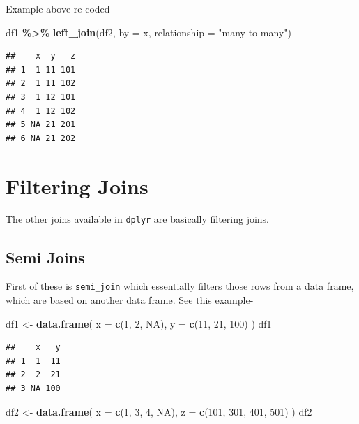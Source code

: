 \documentclass[
]{book}
\newenvironment{Shaded}{\begin{snugshade}}{\end{snugshade}}
\newcommand{\AttributeTok}[1]{\textcolor[rgb]{0.13,0.29,0.53}{#1}}
\newcommand{\ConstantTok}[1]{\textcolor[rgb]{0.56,0.35,0.01}{#1}}
\newcommand{\DecValTok}[1]{\textcolor[rgb]{0.00,0.00,0.81}{#1}}
\newcommand{\FunctionTok}[1]{\textcolor[rgb]{0.13,0.29,0.53}{\textbf{#1}}}
\newcommand{\NormalTok}[1]{#1}
\newcommand{\OtherTok}[1]{\textcolor[rgb]{0.56,0.35,0.01}{#1}}
\newcommand{\SpecialCharTok}[1]{\textcolor[rgb]{0.81,0.36,0.00}{\textbf{#1}}}
\newcommand{\StringTok}[1]{\textcolor[rgb]{0.31,0.60,0.02}{#1}}
\begin{document}
Example above re-coded

\begin{Shaded}
\begin{Highlighting}[]
\NormalTok{df1 }\SpecialCharTok{\%\textgreater{}\%} \FunctionTok{left\_join}\NormalTok{(df2, }\AttributeTok{by =} \StringTok{\textquotesingle{}x\textquotesingle{}}\NormalTok{, }\AttributeTok{relationship =} \StringTok{"many{-}to{-}many"}\NormalTok{)}
\end{Highlighting}
\end{Shaded}

\begin{verbatim}
##    x  y   z
## 1  1 11 101
## 2  1 11 102
## 3  1 12 101
## 4  1 12 102
## 5 NA 21 201
## 6 NA 21 202
\end{verbatim}

\hypertarget{filtering-joins}{%
\section{Filtering Joins}\label{filtering-joins}}

The other joins available in \texttt{dplyr} are basically filtering joins.

\hypertarget{semi-joins}{%
\subsection{Semi Joins}\label{semi-joins}}

First of these is \texttt{semi\_join} which essentially filters those rows from a data frame, which are based on another data frame. See this example-

\begin{Shaded}
\begin{Highlighting}[]
\NormalTok{df1 }\OtherTok{\textless{}{-}} \FunctionTok{data.frame}\NormalTok{(}
  \AttributeTok{x =} \FunctionTok{c}\NormalTok{(}\DecValTok{1}\NormalTok{, }\DecValTok{2}\NormalTok{, }\ConstantTok{NA}\NormalTok{),}
  \AttributeTok{y =} \FunctionTok{c}\NormalTok{(}\DecValTok{11}\NormalTok{, }\DecValTok{21}\NormalTok{, }\DecValTok{100}\NormalTok{)}
\NormalTok{)}
\NormalTok{df1}
\end{Highlighting}
\end{Shaded}

\begin{verbatim}
##    x   y
## 1  1  11
## 2  2  21
## 3 NA 100
\end{verbatim}

\begin{Shaded}
\begin{Highlighting}[]
\NormalTok{df2 }\OtherTok{\textless{}{-}} \FunctionTok{data.frame}\NormalTok{(}
  \AttributeTok{x =} \FunctionTok{c}\NormalTok{(}\DecValTok{1}\NormalTok{, }\DecValTok{3}\NormalTok{, }\DecValTok{4}\NormalTok{, }\ConstantTok{NA}\NormalTok{),}
  \AttributeTok{z =} \FunctionTok{c}\NormalTok{(}\DecValTok{101}\NormalTok{, }\DecValTok{301}\NormalTok{, }\DecValTok{401}\NormalTok{, }\DecValTok{501}\NormalTok{)}
\NormalTok{)}
\NormalTok{df2}
\end{Highlighting}
\end{Shaded}
\end{document}
